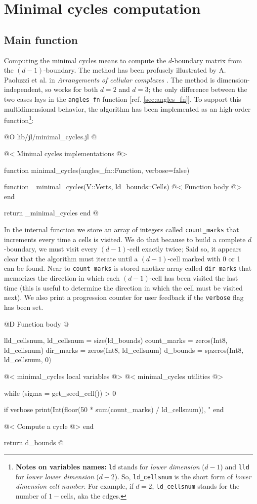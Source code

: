\chapter{Minimal cycles computation}
\label{ch:minimal_cycles}

\section{Main function}


Computing the minimal cycles means to compute the $d$-boundary matrix
from the $(d-1)$-boundary. The method has been profusely illustrated
by A. Paoluzzi et al. in \textit{Arrangements of cellular complexes}
\cite{Paoluzzi}.
The method is dimension-independent, so works for both $d=2$ and $d=3$;
the only difference between the two cases lays in the \texttt{angles\_fn}
function [ref. \ref{sec:angles_fn}]. To support this multidimensional
behavior, the algorithm has been implemented as an high-order function\footnote{
    \textbf{Notes on variables names:} \texttt{ld} stands for \textit{lower dimension} ($d-1$)
    and \texttt{lld} for \textit{lower lower dimension} ($d-2$). So, \texttt{ld\_cellsnum} is the
    short form of \textit{lower dimension cell number}. For example, if $d=2$, \texttt{ld\_cellsnum} stands for the
    number of $1-$cells, aka the edges.
}:

@O lib/jl/minimal_cycles.jl
@{@< Minimal cycles implementations @>

function minimal_cycles(angles_fn::Function, verbose=false)

    function _minimal_cycles(V::Verts, ld_bounds::Cells)
        @< Function body @>
    end

    return _minimal_cycles
end
@}

In the internal function we store an array of integers called \texttt{count\_marks} 
that increments every time a cells is visited. We do that because to build 
a complete $d$-boundary, we must visit every $(d-1)$-cell exactly twice;
Said so, it appears clear that the algorithm must iterate until a $(d-1)$-cell 
marked with 0 or 1 can be found. Near to \texttt{count\_marks} is stored another
array called \texttt{dir\_marks} that memorizes the direction in which each $(d-1)$-cell
has been visited the last time (this is useful to determine the direction in which the cell
must be visited next). We also print a progression counter for user feedback 
if the \texttt{verbose} flag has been set.

@D Function body
@{lld_cellsnum, ld_cellsnum = size(ld_bounds)
count_marks = zeros(Int8, ld_cellsnum)
dir_marks = zeros(Int8, ld_cellsnum)
d_bounds = spzeros(Int8, ld_cellsnum, 0)

@< minimal\_cycles local variables @>
@< minimal\_cycles utilities @>

while (sigma = get_seed_cell()) > 0

    if verbose
        print(Int(floor(50 * sum(count_marks) / ld_cellsnum)), "%
    end

    @< Compute a cycle @>
end

return d_bounds
@}

